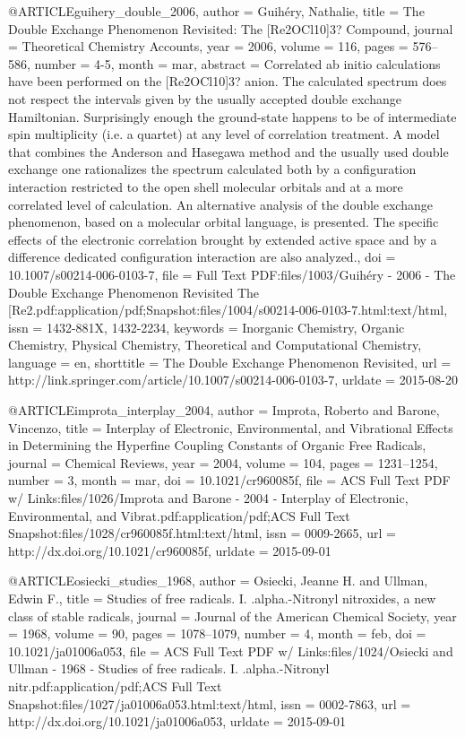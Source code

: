 @ARTICLE{guihery_double_2006,
  author = {Guih{\'e}ry, Nathalie},
  title = {The {Double} {Exchange} {Phenomenon} {Revisited}: {The} [{Re}2OCl10]3?
	{Compound}},
  journal = {Theoretical Chemistry Accounts},
  year = {2006},
  volume = {116},
  pages = {576--586},
  number = {4-5},
  month = mar,
  abstract = {Correlated ab initio calculations have been performed on the [Re2OCl10]3?
	anion. The calculated spectrum does not respect the intervals given
	by the usually accepted double exchange Hamiltonian. Surprisingly
	enough the ground-state happens to be of intermediate spin multiplicity
	(i.e. a quartet) at any level of correlation treatment. A model that
	combines the Anderson and Hasegawa method and the usually used double
	exchange one rationalizes the spectrum calculated both by a configuration
	interaction restricted to the open shell molecular orbitals and at
	a more correlated level of calculation. An alternative analysis of
	the double exchange phenomenon, based on a molecular orbital language,
	is presented. The specific effects of the electronic correlation
	brought by extended active space and by a difference dedicated configuration
	interaction are also analyzed.},
  doi = {10.1007/s00214-006-0103-7},
  file = {Full Text PDF:files/1003/Guihéry - 2006 - The Double Exchange Phenomenon Revisited The [Re2.pdf:application/pdf;Snapshot:files/1004/s00214-006-0103-7.html:text/html},
  issn = {1432-881X, 1432-2234},
  keywords = {Inorganic Chemistry, Organic Chemistry, Physical Chemistry, Theoretical
	and Computational Chemistry},
  language = {en},
  shorttitle = {The {Double} {Exchange} {Phenomenon} {Revisited}},
  url = {http://link.springer.com/article/10.1007/s00214-006-0103-7},
  urldate = {2015-08-20}
}

@ARTICLE{improta_interplay_2004,
  author = {Improta, Roberto and Barone, Vincenzo},
  title = {Interplay of {Electronic}, {Environmental}, and {Vibrational} {Effects}
	in {Determining} the {Hyperfine} {Coupling} {Constants} of {Organic}
	{Free} {Radicals}},
  journal = {Chemical Reviews},
  year = {2004},
  volume = {104},
  pages = {1231--1254},
  number = {3},
  month = mar,
  doi = {10.1021/cr960085f},
  file = {ACS Full Text PDF w/ Links:files/1026/Improta and Barone - 2004 - Interplay of Electronic,    Environmental, and Vibrat.pdf:application/pdf;ACS Full Text Snapshot:files/1028/cr960085f.html:text/html},
  issn = {0009-2665},
  url = {http://dx.doi.org/10.1021/cr960085f},
  urldate = {2015-09-01}
}

@ARTICLE{osiecki_studies_1968,
  author = {Osiecki, Jeanne H. and Ullman, Edwin F.},
  title = {Studies of free radicals. {I}. .alpha.-{Nitronyl} nitroxides, a new
	class of stable radicals},
  journal = {Journal of the American Chemical Society},
  year = {1968},
  volume = {90},
  pages = {1078--1079},
  number = {4},
  month = feb,
  doi = {10.1021/ja01006a053},
  file = {ACS Full Text PDF w/ Links:files/1024/Osiecki and Ullman - 1968 - Studies of free radicals.   I. .alpha.-Nitronyl nitr.pdf:application/pdf;ACS Full Text Snapshot:files/1027/ja01006a053.html:text/html},
  issn = {0002-7863},
  url = {http://dx.doi.org/10.1021/ja01006a053},
  urldate = {2015-09-01}
}

